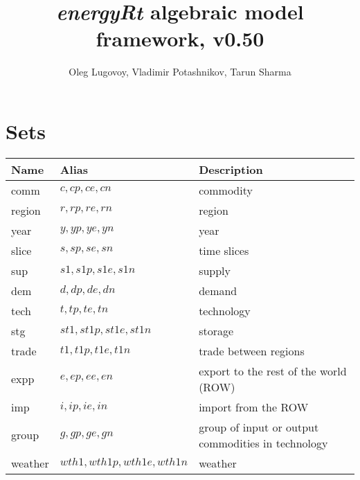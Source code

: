 \documentclass{article}
\title{\emph{energyRt} algebraic model framework, v0.50}
\author{Oleg Lugovoy, Vladimir Potashnikov, Tarun Sharma}
\begin{document}
\maketitle
\section*{Sets}
\begin{longtable}{| l | l | l |}
\hline
\bf{Name} & \bf{Alias} & \bf{Description} \\
 \hline
comm & $c,cp,ce,cn$ & commodity \\
 \hline
region & $r,rp,re,rn$ & region \\
 \hline
year & $y,yp,ye,yn$ & year \\
 \hline
slice & $s,sp,se,sn$ & time slices \\
 \hline
sup & $s1,s1p,s1e,s1n$ & supply \\
 \hline
dem & $d,dp,de,dn$ & demand \\
 \hline
tech & $t,tp,te,tn$ & technology \\
 \hline
stg & $st1,st1p,st1e,st1n$ & storage \\
 \hline
trade & $t1,t1p,t1e,t1n$ & trade between regions \\
 \hline
expp & $e,ep,ee,en$ & export to the rest of the world (ROW) \\
 \hline
imp & $i,ip,ie,in$ & import from the ROW \\
 \hline
group & $g,gp,ge,gn$ & group of input or output commodities in technology \\
 \hline
weather & $wth1,wth1p,wth1e,wth1n$ & weather \\
 \hline
\end{longtable}
\end{document}
